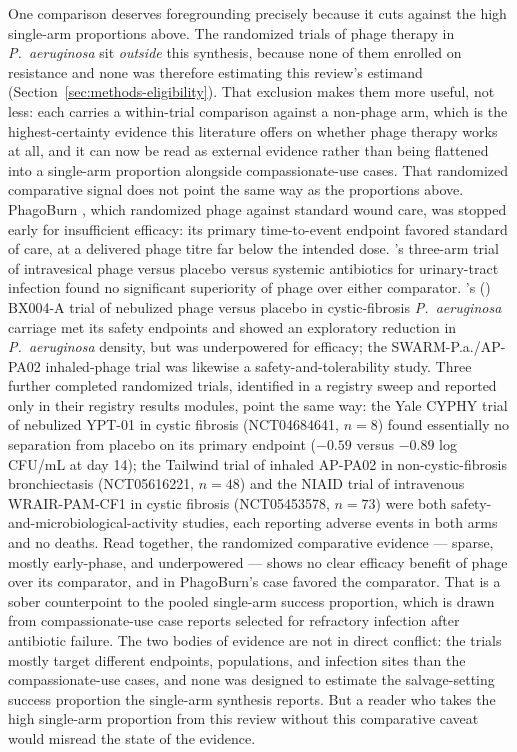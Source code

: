 One comparison deserves foregrounding precisely because it cuts against the high single-arm proportions above. The randomized trials of phage therapy in \textit{P.\ aeruginosa} sit \emph{outside} this synthesis, because none of them enrolled on resistance and none was therefore estimating this review's estimand (Section~\ref{sec:methods-eligibility}). That exclusion makes them more useful, not less: each carries a within-trial comparison against a non-phage arm, which is the highest-certainty evidence this literature offers on whether phage therapy works at all, and it can now be read as external evidence rather than being flattened into a single-arm proportion alongside compassionate-use cases. That randomized comparative signal does not point the same way as the proportions above. PhagoBurn \parencite{Jault2019_phagoburn}, which randomized phage against standard wound care, was stopped early for insufficient efficacy: its primary time-to-event endpoint favored standard of care, at a delivered phage titre far below the intended dose. \textcite{Leitner2021_lancetid_pyophage}'s three-arm trial of intravesical phage versus placebo versus systemic antibiotics for urinary-tract infection found no significant superiority of phage over either comparator. \citeauthor{Weiner2025_natcomms}'s (\citeyear{Weiner2025_natcomms}) BX004-A trial of nebulized phage versus placebo in cystic-fibrosis \textit{P.\ aeruginosa} carriage met its safety endpoints and showed an exploratory reduction in \textit{P.\ aeruginosa} density, but was underpowered for efficacy; the SWARM-P.a./AP-PA02 inhaled-phage trial \parencite{Armata_swarmpa} was likewise a safety-and-tolerability study. Three further completed randomized trials, identified in a registry sweep and reported only in their registry results modules, point the same way: the Yale CYPHY trial of nebulized YPT-01 in cystic fibrosis (NCT04684641, $n=8$) found essentially no separation from placebo on its primary endpoint ($-0.59$ versus $-0.89$ log CFU/mL at day 14); the Tailwind trial of inhaled AP-PA02 in non-cystic-fibrosis bronchiectasis (NCT05616221, $n=48$) and the NIAID trial of intravenous WRAIR-PAM-CF1 in cystic fibrosis (NCT05453578, $n=73$) were both safety-and-microbiological-activity studies, each reporting adverse events in both arms and no deaths. Read together, the randomized comparative evidence --- sparse, mostly early-phase, and underpowered --- shows no clear efficacy benefit of phage over its comparator, and in PhagoBurn's case favored the comparator. That is a sober counterpoint to the \CsOverallEst pooled single-arm success proportion, which is drawn from compassionate-use case reports selected for refractory infection after antibiotic failure. The two bodies of evidence are not in direct conflict: the trials mostly target different endpoints, populations, and infection sites than the compassionate-use cases, and none was designed to estimate the salvage-setting success proportion the single-arm synthesis reports. But a reader who takes the high single-arm proportion from this review without this comparative caveat would misread the state of the evidence.

